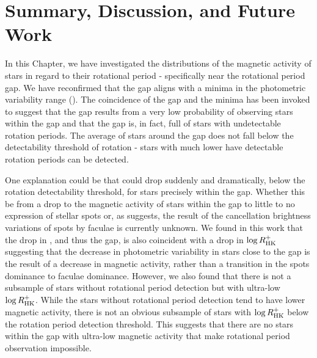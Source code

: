 \section{Summary, Discussion, and Future Work}
\label{sec:sum_dis}

In this Chapter, we have investigated the distributions of the magnetic activity of stars in regard to their rotational period - specifically near the rotational period gap.
We have reconfirmed that the gap aligns with a minima in the photometric variability range (\rper).
The coincidence of the gap and the minima has been invoked to suggest that the gap results from a very low probability of observing stars within the gap and that the gap is, in fact, full of stars with undetectable rotation periods.
The average \rper{} of stars around the gap does not fall below the detectability threshold of rotation - stars with much lower \rper{} have detectable rotation periods can be detected.

One explanation could be that \rper{} could drop suddenly and dramatically, below the rotation detectability threshold, for stars precisely within the gap.
Whether this be from a drop to the magnetic activity of stars within the gap to little to no expression of stellar spots or, as \citet{reinhold_transition_2018} suggests, the result of the cancellation brightness variations of spots by faculae is currently unknown.
We found in this work that the drop in \rper{}, and thus the gap, is also coincident with a drop in $\log R^{+}_{\rm{HK}}$ suggesting that the decrease in photometric variability in stars close to the gap is the result of a decrease in magnetic activity, rather than a transition in the spots dominance to faculae dominance.
However, we also found that there is not a subsample of stars without rotational period detection but with ultra-low $\log R^{+}_{\rm{HK}}$.
While the stars without rotational period detection tend to have lower magnetic activity, there is not an obvious subsample of stars with $\log R^{+}_{\rm{HK}}$ below the rotation period detection threshold.
This suggests that there are no stars within the gap with ultra-low magnetic activity that make rotational period observation impossible.

